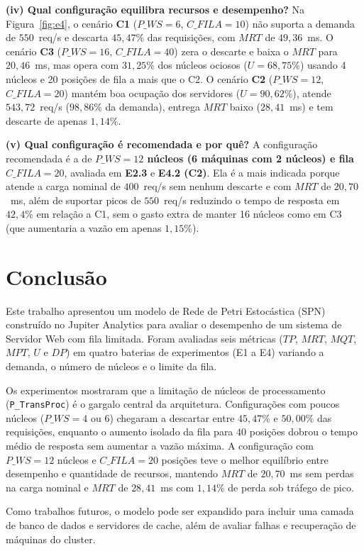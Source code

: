 \documentclass[conference,10pt]{IEEEtran}
\begin{document}
\textbf{(iv) Qual configuração equilibra recursos e desempenho?} Na Figura~\ref{fig:e4}, o cenário \textbf{C1} ($P\_WS = 6$, $C\_FILA = 10$) não suporta a demanda de $550$~req/s e descarta $45,47\%$ das requisições, com $MRT$ de $49,36$~ms. O cenário \textbf{C3} ($P\_WS = 16$, $C\_FILA = 40$) zera o descarte e baixa o $MRT$ para $20,46$~ms, mas opera com $31,25\%$ dos núcleos ociosos ($U = 68,75\%$) usando 4 núcleos e 20 posições de fila a mais que o C2. O cenário \textbf{C2} ($P\_WS = 12$, $C\_FILA = 20$) mantém boa ocupação dos servidores ($U = 90,62\%$), atende $543,72$~req/s ($98,86\%$ da demanda), entrega $MRT$ baixo ($28,41$~ms) e tem descarte de apenas $1,14\%$.

\textbf{(v) Qual configuração é recomendada e por quê?} A configuração recomendada é a de \textbf{$P\_WS = 12$ núcleos (6 máquinas com 2 núcleos) e fila $C\_FILA = 20$}, avaliada em \textbf{E2.3} e \textbf{E4.2 (C2)}. Ela é a mais indicada porque atende a carga nominal de $400$~req/s sem nenhum descarte e com $MRT$ de $20,70$~ms, além de suportar picos de $550$~req/s reduzindo o tempo de resposta em $42,4\%$ em relação a C1, sem o gasto extra de manter 16 núcleos como em C3 (que aumentaria a vazão em apenas $1,15\%$).

\section{Conclusão}
Este trabalho apresentou um modelo de Rede de Petri Estocástica (SPN) construído no Jupiter Analytics para avaliar o desempenho de um sistema de Servidor Web com fila limitada. Foram avaliadas seis métricas ($TP$, $MRT$, $MQT$, $MPT$, $U$ e $DP$) em quatro baterias de experimentos (E1 a E4) variando a demanda, o número de núcleos e o limite da fila.

Os experimentos mostraram que a limitação de núcleos de processamento (\texttt{P\_TransProc}) é o gargalo central da arquitetura. Configurações com poucos núcleos ($P\_WS = 4$ ou $6$) chegaram a descartar entre $45,47\%$ e $50,00\%$ das requisições, enquanto o aumento isolado da fila para $40$ posições dobrou o tempo médio de resposta sem aumentar a vazão máxima. A configuração com $P\_WS = 12$ núcleos e $C\_FILA = 20$ posições teve o melhor equilíbrio entre desempenho e quantidade de recursos, mantendo $MRT$ de $20,70$~ms sem perdas na carga nominal e $MRT$ de $28,41$~ms com $1,14\%$ de perda sob tráfego de pico.

Como trabalhos futuros, o modelo pode ser expandido para incluir uma camada de banco de dados e servidores de cache, além de avaliar falhas e recuperação de máquinas do cluster.
\end{document}
